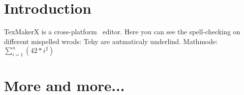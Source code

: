 \documentclass[10pt,a4paper]{article}
\begin{document}
\section{Introduction}
TexMakerX is a cross-platform \LATeX ~editor.
Here you can see the spell-checking on different mispelled wrods: Tehy are autmaticaly underlind.
Mathmode: $\sum\limits^n_{i=1}\left(42*i^2\right)$
\section{More and more...}
\end{document}
